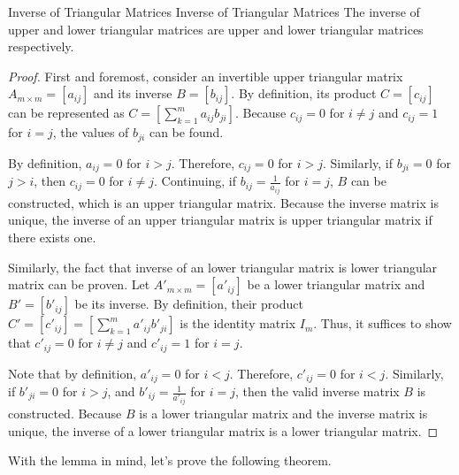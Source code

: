 \documentclass[../main.tex]{subfiles}
\begin{document}
\begin{lemma}{Inverse of Triangular Matrices}
{Inverse of Triangular Matrices}
The inverse of upper and lower triangular matrices are upper and
lower triangular matrices respectively.
\end{lemma}
\begin{proof}
First and foremost, consider an invertible upper triangular matrix
$A_{m \times m} = [a_{ij}]$ and its inverse $B = [b_{ij}]$.
By definition, its product $C = [c_{ij}]$ can be represented as
$C = [ \sum_{k = 1}^m a_{ij} b_{ji} ]$. Because $c_{ij} = 0$ for
$i \neq j$ and $c_{ij} = 1$ for $i = j$, the values of $b_{ji}$
can be found.

By definition, $a_{ij} = 0$ for $i > j$. Therefore, $c_{ij} = 0$
for $i > j$. Similarly, if $b_{ji} = 0$ for $j > i$, then $c_{ij} = 0$
for $i \neq j$. Continuing, if $b_{ij} = \frac{1}{a_{ij}}$ for
$i = j$, $B$ can be constructed, which is an upper triangular
matrix. Because the inverse matrix is unique, the inverse of an
upper triangular matrix is upper triangular matrix if there exists
one.

Similarly, the fact that inverse of an lower triangular matrix is
lower triangular matrix can be proven. Let $A'_{m \times m} =
[a'_{ij}]$ be a lower triangular matrix and $B' = [b'_{ij}]$ be
its inverse. By definition, their product $C' = [c'_{ij}] =
[ \sum_{k = 1}^m a'_{ij} b'_{ji} ]$ is the identity matrix $I_m$.
Thus, it suffices to show that $c'_{ij} = 0$ for $i \neq j$ and
$c'_{ij} = 1$ for $i = j$.

Note that by definition, $a'_{ij} = 0$ for $i < j$. Therefore,
$c'_{ij} = 0$ for $i < j$. Similarly, if $b'_{ji} = 0$ for $i > j$,
and $b'_{ij} = \frac{1}{a'_{ij}}$ for $i = j$, then the valid
inverse matrix $B$ is constructed. Because $B$ is a lower triangular
matrix and the inverse matrix is unique, the inverse of a lower
triangular matrix is a lower triangular matrix.
\end{proof}

With the lemma in mind, let's prove the following theorem.
\end{document}
